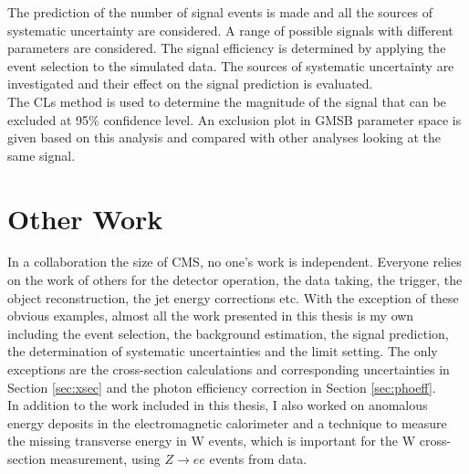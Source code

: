 The prediction of the number of signal events is made and all the sources of
systematic uncertainty are considered. A range of possible signals with
different parameters are considered. The signal efficiency is determined by 
applying the event selection to the simulated data. The sources of systematic 
uncertainty are investigated and their effect on the signal prediction is 
evaluated. \\

The CLs method \cite{cls} is used to determine the magnitude of the signal that
can be excluded at 95\% confidence level. An exclusion plot in GMSB parameter 
space is given based on this analysis and compared with other analyses looking 
at the same signal.

\section{Other Work}

In a collaboration the size of CMS, no one's work is independent. Everyone
relies on the work of others for the detector operation, the data taking, the
trigger, the object reconstruction, the jet energy corrections etc. With the
exception of these obvious examples, almost all the work presented in this 
thesis is my own including the event selection, the background estimation, the
signal prediction, the determination of systematic uncertainties and the limit
setting. The only exceptions are the cross-section calculations and 
corresponding uncertainties in Section \ref{sec:xsec} and the photon efficiency
correction in Section \ref{sec:phoeff}. \\

In addition to the work included in this thesis, I also worked on anomalous 
energy deposits in the electromagnetic calorimeter and a technique to measure 
the missing transverse energy in W events, which is important for the W
cross-section measurement, using $Z\rightarrow ee$ events from data.
